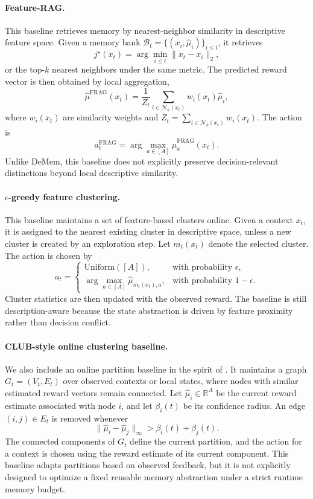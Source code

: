 \documentclass{article}
\theoremstyle{plain}
\theoremstyle{definition}
\theoremstyle{remark}
\begin{document}
\paragraph{Feature-RAG.}
This baseline retrieves memory by nearest-neighbor similarity in descriptive feature space. 
Given a memory bank \(\mathcal{B}_t = \{(x_i,\hat{\mu}_i)\}_{i\le t}\), it retrieves
\[
j^\star(x_t)=\arg\min_{i\le t}\|x_t-x_i\|_2,
\]
or the top-\(k\) nearest neighbors under the same metric. 
The predicted reward vector is then obtained by local aggregation,
\[
\hat{\mu}^{\mathrm{FRAG}}(x_t)
=
\frac{1}{Z_t}\sum_{i\in \mathcal{N}_k(x_t)} w_i(x_t)\hat{\mu}_i,
\]
where \(w_i(x_t)\) are similarity weights and \(Z_t=\sum_{i\in\mathcal{N}_k(x_t)}w_i(x_t)\). 
The action is
\[
a_t^{\mathrm{FRAG}}=\arg\max_{a\in[A]}\hat{\mu}^{\mathrm{FRAG}}_a(x_t).
\]
Unlike DeMem, this baseline does not explicitly preserve decision-relevant distinctions beyond local descriptive similarity.
\paragraph{\(\epsilon\)-greedy feature clustering.}
This baseline maintains a set of feature-based clusters online. 
Given a context \(x_t\), it is assigned to the nearest existing cluster in descriptive space, unless a new cluster is created by an exploration step. 
Let \(m_t(x_t)\) denote the selected cluster. 
The action is chosen by
\[
a_t=
\begin{cases}
\text{Uniform}([A]), & \text{with probability } \epsilon,\\
\arg\max_{a\in[A]}\hat{\mu}_{m_t(x_t),a}, & \text{with probability } 1-\epsilon.
\end{cases}
\]
Cluster statistics are then updated with the observed reward. 
The baseline is still description-aware because the state abstraction is driven by feature proximity rather than decision conflict.
\paragraph{CLUB-style online clustering baseline.}
We also include an online partition baseline in the spirit of \citet{gentile2014onlineclusteringbandits}. 
It maintains a graph \(G_t=(V_t,E_t)\) over observed contexts or local states, where nodes with similar estimated reward vectors remain connected. 
Let \(\hat{\mu}_i\in\mathbb{R}^A\) be the current reward estimate associated with node \(i\), and let \(\beta_i(t)\) be its confidence radius. 
An edge \((i,j)\in E_t\) is removed whenever
\[
\|\hat{\mu}_i - \hat{\mu}_j\|_\infty > \beta_i(t)+\beta_j(t).
\]
The connected components of \(G_t\) define the current partition, and the action for a context is chosen using the reward estimate of its current component. 
This baseline adapts partitions based on observed feedback, but it is not explicitly designed to optimize a fixed reusable memory abstraction under a strict runtime memory budget.
\end{document}
